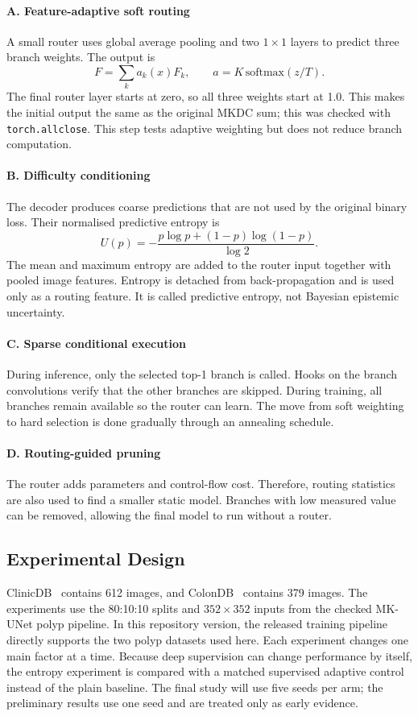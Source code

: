 \documentclass[10pt,a4paper]{article}
\begin{document}
\paragraph{A. Feature-adaptive soft routing} A small router uses global average pooling and two $1\times1$ layers to predict three branch weights. The output is
\[
F=\sum_k a_k(x)F_k, \qquad a=K\,\mathrm{softmax}(z/T).
\]
The final router layer starts at zero, so all three weights start at 1.0. This makes the initial output the same as the original MKDC sum; this was checked with \texttt{torch.allclose}. This step tests adaptive weighting but does not reduce branch computation.

\paragraph{B. Difficulty conditioning} The decoder produces coarse predictions that are not used by the original binary loss. Their normalised predictive entropy is
\[
U(p)=-\frac{p\log p+(1-p)\log(1-p)}{\log 2}.
\]
The mean and maximum entropy are added to the router input together with pooled image features. Entropy is detached from back-propagation and is used only as a routing feature. It is called predictive entropy, not Bayesian epistemic uncertainty.

\paragraph{C. Sparse conditional execution} During inference, only the selected top-1 branch is called. Hooks on the branch convolutions verify that the other branches are skipped. During training, all branches remain available so the router can learn. The move from soft weighting to hard selection is done gradually through an annealing schedule.

\paragraph{D. Routing-guided pruning} The router adds parameters and control-flow cost. Therefore, routing statistics are also used to find a smaller static model. Branches with low measured value can be removed, allowing the final model to run without a router.

\subsection{Experimental Design}

ClinicDB~\cite{bernal2015clinicdb} contains 612 images, and ColonDB~\cite{vazquez2017colondb} contains 379 images. The experiments use the 80:10:10 splits and $352\times352$ inputs from the checked MK-UNet polyp pipeline. In this repository version, the released training pipeline directly supports the two polyp datasets used here. Each experiment changes one main factor at a time. Because deep supervision can change performance by itself, the entropy experiment is compared with a matched supervised adaptive control instead of the plain baseline. The final study will use five seeds per arm; the preliminary results use one seed and are treated only as early evidence.
\end{document}
